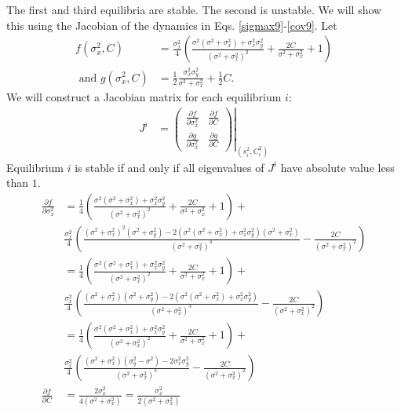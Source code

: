 \documentclass{article}
\begin{document}
\begin{enumerate}
\begin{enumerate}[1.]
\end{enumerate}
The first and third equilibria are stable. The second is unstable. We will show this using the Jacobian of the dynamics in Eqs. \ref{sigmax9}-\ref{cov9}. Let 
\begin{align*}
f(\sigma_x^2,C)&=\frac{\sigma_x^2}{4}\left(\frac{\sigma^2(\sigma^2+\sigma_x^2)+\sigma_x^2\sigma_y^2}{(\sigma^2+\sigma_x^2)^2}+\frac{2C}{\sigma^2+\sigma_x^2}+1\right)
\\ \text{ and } g(\sigma_x^2,C)&=\frac{1}{2}\frac{\sigma_x^2\sigma_y^2}{\sigma^2+\sigma_x^2}+\frac{1}{2}C.
\end{align*}
We will construct a Jacobian matrix for each equilibrium $i$:
\begin{align*}
J^i&=\left.\left(\begin{array}{cc} \frac{\partial f}{\partial \sigma_x^2} & \frac{\partial f }{\partial C} \\ \frac{\partial g}{\partial \sigma_x^2} & \frac{\partial g}{\partial C}\end{array}\right)\right|_{(s_i^2,C_i^2)}
\end{align*}
Equilibrium $i$ is stable if and only if all eigenvalues of $J^i$ have absolute value less than $1$. 
\begin{align*}
\frac{\partial f}{\partial \sigma_x^2}&=\frac{1}{4}\left(\frac{\sigma^2(\sigma^2+\sigma_x^2)+\sigma_x^2\sigma_y^2}{(\sigma^2+\sigma_x^2)^2}+\frac{2C}{\sigma^2+\sigma_x^2}+1\right)+
\\&\frac{\sigma_x^2}{4}\left(\frac{(\sigma^2+\sigma_x^2)^2(\sigma^2+\sigma_y^2)-2(\sigma^2(\sigma^2+\sigma_x^2)+\sigma_x^2\sigma_y^2)(\sigma^2+\sigma_x^2)}{(\sigma^2+\sigma_x^2)^4}-\frac{2C}{(\sigma^2+\sigma_x^2)^2}\right)
\\&=\frac{1}{4}\left(\frac{\sigma^2(\sigma^2+\sigma_x^2)+\sigma_x^2\sigma_y^2}{(\sigma^2+\sigma_x^2)^2}+\frac{2C}{\sigma^2+\sigma_x^2}+1\right)+
\\&\frac{\sigma_x^2}{4}\left(\frac{(\sigma^2+\sigma_x^2)(\sigma^2+\sigma_y^2)-2(\sigma^2(\sigma^2+\sigma_x^2)+\sigma_x^2\sigma_y^2)}{(\sigma^2+\sigma_x^2)^3}-\frac{2C}{(\sigma^2+\sigma_x^2)^2}\right)
\\&=\frac{1}{4}\left(\frac{\sigma^2(\sigma^2+\sigma_x^2)+\sigma_x^2\sigma_y^2}{(\sigma^2+\sigma_x^2)^2}+\frac{2C}{\sigma^2+\sigma_x^2}+1\right)+
\\&\frac{\sigma_x^2}{4}\left(\frac{(\sigma^2+\sigma_x^2)(\sigma_y^2-\sigma^2)-2\sigma_x^2\sigma_y^2}{(\sigma^2+\sigma_x^2)^3}-\frac{2C}{(\sigma^2+\sigma_x^2)^2}\right)
\\ \frac{\partial f}{\partial C}&=\frac{2\sigma_x^2}{4(\sigma^2+\sigma_x^2)}=\frac{\sigma_x^2}{2(\sigma^2+\sigma_x^2)}

\end{align*}
\end{enumerate}
\end{document}
